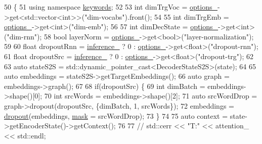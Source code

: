 \begin{DoxyCode}
50                                                                        \{
51     \textcolor{keyword}{using namespace }\hyperlink{namespacekeywords}{keywords};
52 
53     \textcolor{keywordtype}{int} dimTrgVoc = \hyperlink{classmarian_1_1EncoderDecoder_a467e7d547bd7888d1bea248e99cef212}{options\_}->get<std::vector<int>>(\textcolor{stringliteral}{"dim-vocabs"}).front();
54 
55     \textcolor{keywordtype}{int} dimTrgEmb = \hyperlink{classmarian_1_1EncoderDecoder_a467e7d547bd7888d1bea248e99cef212}{options\_}->get<\textcolor{keywordtype}{int}>(\textcolor{stringliteral}{"dim-emb"});
56 
57     \textcolor{keywordtype}{int} dimDecState = \hyperlink{classmarian_1_1EncoderDecoder_a467e7d547bd7888d1bea248e99cef212}{options\_}->get<\textcolor{keywordtype}{int}>(\textcolor{stringliteral}{"dim-rnn"});
58     \textcolor{keywordtype}{bool} layerNorm = \hyperlink{classmarian_1_1EncoderDecoder_a467e7d547bd7888d1bea248e99cef212}{options\_}->get<\textcolor{keywordtype}{bool}>(\textcolor{stringliteral}{"layer-normalization"});
59 
60     \textcolor{keywordtype}{float} dropoutRnn = \hyperlink{classmarian_1_1EncoderDecoder_a51626185014f44e369ca9ea8b9da7c10}{inference\_} ? 0 : \hyperlink{classmarian_1_1EncoderDecoder_a467e7d547bd7888d1bea248e99cef212}{options\_}->get<\textcolor{keywordtype}{float}>(\textcolor{stringliteral}{"dropout-rnn"});
61     \textcolor{keywordtype}{float} dropoutSrc = \hyperlink{classmarian_1_1EncoderDecoder_a51626185014f44e369ca9ea8b9da7c10}{inference\_} ? 0 : \hyperlink{classmarian_1_1EncoderDecoder_a467e7d547bd7888d1bea248e99cef212}{options\_}->get<\textcolor{keywordtype}{float}>(\textcolor{stringliteral}{"dropout-trg"});
62 
63     \textcolor{keyword}{auto} stateS2S = std::dynamic\_pointer\_cast<DecoderStateS2S>(state);
64 
65     \textcolor{keyword}{auto} embeddings = stateS2S->getTargetEmbeddings();
66     \textcolor{keyword}{auto} graph = embeddings->graph();
67 
68     \textcolor{keywordflow}{if}(dropoutSrc) \{
69       \textcolor{keywordtype}{int} dimBatch = embeddings->shape()[0];
70       \textcolor{keywordtype}{int} srcWords = embeddings->shape()[2];
71       \textcolor{keyword}{auto} srcWordDrop = graph->dropout(dropoutSrc, \{dimBatch, 1, srcWords\});
72       embeddings = \hyperlink{namespacemarian_a268400392f22176821c7c4a36733b178}{dropout}(embeddings, \hyperlink{namespacemarian_1_1keywords_a201bea6bea8108889b63081132cc3cd7}{mask} = srcWordDrop);
73     \}
74 
75     \textcolor{keyword}{auto} context = state->getEncoderState()->getContext();
76 
77     \textcolor{comment}{// std::cerr << "T:" << attention\_ << std::endl;}

\end{DoxyCode}

